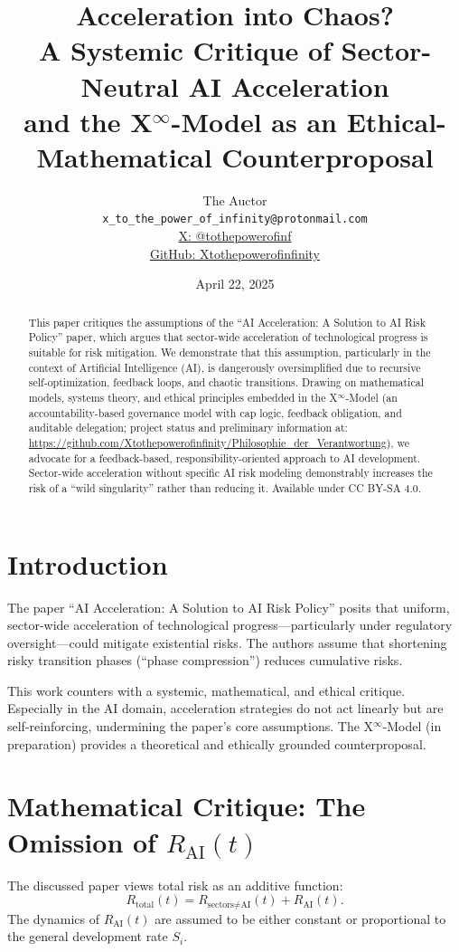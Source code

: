 \documentclass[11pt]{article}
\title{Acceleration into Chaos? \\
A Systemic Critique of Sector-Neutral AI Acceleration \\
and the X$^\infty$-Model as an Ethical-Mathematical Counterproposal}
\author{The Auctor \\ 
\texttt{x\_to\_the\_power\_of\_infinity@protonmail.com} \\
\href{https://x.com/tothepowerofinf}{X: @tothepowerofinf} \\
\href{https://github.com/Xtothepowerofinfinity/Philosophie_der_Verantwortung}{GitHub: Xtothepowerofinfinity}
}
\date{April 22, 2025}
\begin{document}
\maketitle

\begin{abstract}
This paper critiques the assumptions of the ``AI Acceleration: A Solution to AI Risk Policy'' paper, which argues that sector-wide acceleration of technological progress is suitable for risk mitigation. We demonstrate that this assumption, particularly in the context of Artificial Intelligence (AI), is dangerously oversimplified due to recursive self-optimization, feedback loops, and chaotic transitions. Drawing on mathematical models, systems theory, and ethical principles embedded in the X$^\infty$-Model (an accountability-based governance model with cap logic, feedback obligation, and auditable delegation; project status and preliminary information at: \url{https://github.com/Xtothepowerofinfinity/Philosophie_der_Verantwortung}), we advocate for a feedback-based, responsibility-oriented approach to AI development. Sector-wide acceleration without specific AI risk modeling demonstrably increases the risk of a ``wild singularity'' rather than reducing it. Available under CC BY-SA 4.0.
\end{abstract}


\section{Introduction}
The paper ``AI Acceleration: A Solution to AI Risk Policy'' \citep{TrammellAschenbrenner2024} posits that uniform, sector-wide acceleration of technological progress—particularly under regulatory oversight—could mitigate existential risks. The authors assume that shortening risky transition phases (``phase compression'') reduces cumulative risks.

This work counters with a systemic, mathematical, and ethical critique. Especially in the AI domain, acceleration strategies do not act linearly but are self-reinforcing, undermining the paper's core assumptions. The X$^\infty$-Model (in preparation) provides a theoretical and ethically grounded counterproposal.

\section{Mathematical Critique: The Omission of $R_{\text{AI}}(t)$}
The discussed paper views total risk as an additive function:
\begin{equation}
R_{\text{total}}(t) = R_{\text{sectors} \neq \text{AI}}(t) + R_{\text{AI}}(t).
\end{equation}
The dynamics of $R_{\text{AI}}(t)$ are assumed to be either constant or proportional to the general development rate $S_i$.
\end{document}

